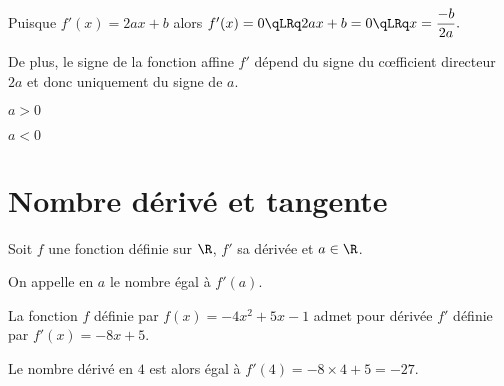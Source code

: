 \documentclass[10pt,openright,twoside,french]{book}
\begin{document}
\begin{Rmq}
    Puisque $f'(x) = 2ax + b$ alors $f'(x) = 0 \qLRq 2ax + b = 0 \qLRq x = \dfrac{-b}{2a}.$\par
    De plus, le signe de la fonction affine $f'$ dépend du signe du c{\oe}fficient directeur $2a$ et donc uniquement du signe de $a$.
\end{Rmq}\medskip

\begin{minipage}{0.45\linewidth}
\begin{center}
    $a > 0$\medskip

\end{center}
\end{minipage}\hfill
\begin{minipage}{0.45\linewidth}
\begin{center}
    $a < 0$\medskip

\end{center}
\end{minipage}

\section{Nombre dérivé et tangente}
\begin{Defi}
    Soit $f$ une fonction définie sur $\R$, $f'$ sa dérivée et $a \in \R$.\par
    On appelle  en $a$ le nombre égal à $f'(a)$.
\end{Defi}

\begin{Exemple}
    La fonction $f$ définie par $f(x) = -4x^2 + 5x -1$ admet pour dérivée $f'$ définie par $f'(x) = -8x + 5$.\par
    Le nombre dérivé en $4$ est alors égal à $f'(4) = -8 \times 4 + 5 = -27$.
\end{Exemple}
\end{document}
